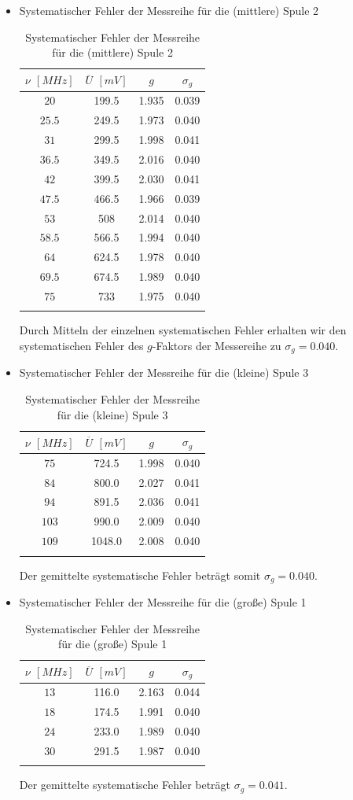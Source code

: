 \documentclass[a4paper,titlepage]{scrartcl}
\numberwithin{equation}{section}
\begin{document}
\begin{itemize}
\item Systematischer Fehler der Messreihe für die (mittlere) Spule 2 
\begin{longtable}[H]{c|c|c|c}
$\nu$ $[MHz]$ & $\overline{U}$ $[mV]$ & $g$ & $\sigma_g$ \\
\hline
$20$ & 199.5 & 1.935 & 0.039\\
$25.5$ & 249.5 & 1.973 & 0.040\\
$31$ & 299.5 & 1.998 & 0.041\\
$36.5$ & 349.5 & 2.016 & 0.040\\
$42$ & 399.5 & 2.030 & 0.041\\
$47.5$ & 466.5 & 1.966 & 0.039\\
$53$ & 508 & 2.014 & 0.040\\
$58.5$ & 566.5 & 1.994 & 0.040\\
$64$ & 624.5 & 1.978 & 0.040\\
$69.5$ & 674.5 & 1.989 & 0.040\\
$75$ & 733 & 1.975 & 0.040\\
\caption{Systematischer Fehler der Messreihe für die (mittlere) Spule 2}
\label{tab:sysfehlerspule2}
\end{longtable}
Durch Mitteln der einzelnen systematischen Fehler erhalten wir den systematischen Fehler des $g$-Faktors der Messereihe zu $\sigma_{g}=0.040$.
\item Systematischer Fehler der Messreihe für die (kleine) Spule 3
\begin{longtable}[H]{c|c|c|c}
$\nu$ $[MHz]$ & $\overline{U}$ $[mV]$ & $g$ & $\sigma_g$ \\
\hline
$75$ & 724.5 & 1.998 & 0.040\\
$84$ & 800.0 & 2.027 & 0.041\\
$94$ & 891.5 & 2.036 & 0.041\\
$103$ & 990.0 & 2.009 & 0.040\\
$109$ & 1048.0 & 2.008 & 0.040\\
\caption{Systematischer Fehler der Messreihe für die (kleine) Spule 3}
\label{tab:sysfehlerspule3}
\end{longtable}
Der gemittelte systematische Fehler beträgt somit $\sigma_g=0.040$.
\item Systematischer Fehler der Messreihe für die (große) Spule 1
\begin{longtable}[H]{c|c|c|c}
$\nu$ $[MHz]$ & $\overline{U}$ $[mV]$ & $g$ & $\sigma_g$ \\
\hline
$13$ & 116.0 & 2.163 & 0.044\\
$18$ & 174.5 & 1.991 & 0.040\\
$24$ & 233.0 & 1.989 & 0.040\\
$30$ & 291.5 & 1.987 & 0.040\\
\caption{Systematischer Fehler der Messreihe für die (große) Spule 1}
\label{tab:sysfehlerspule1}
\end{longtable}
Der gemittelte systematische Fehler beträgt $\sigma_g=0.041$.
\end{itemize}
\end{document}
